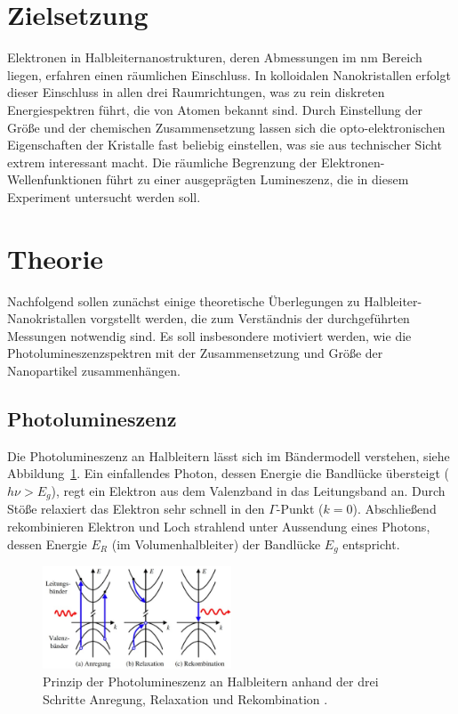 \setcounter{page}{1}
\section*{Zielsetzung}
Elektronen in Halbleiternanostrukturen, deren Abmessungen im $\si{\nano\meter}$ Bereich liegen,
erfahren einen räumlichen Einschluss. In kolloidalen Nanokristallen erfolgt dieser Einschluss
in allen drei Raumrichtungen, was zu rein diskreten Energiespektren führt, die von Atomen bekannt sind.
Durch Einstellung der Größe und der chemischen Zusammensetzung lassen sich die opto-elektronischen
Eigenschaften der Kristalle fast beliebig einstellen, was sie aus technischer Sicht extrem interessant macht.
Die räumliche Begrenzung der Elektronen-Wellenfunktionen führt zu einer ausgeprägten Lumineszenz, die
in diesem Experiment untersucht werden soll.

\section{Theorie}
Nachfolgend sollen zunächst einige theoretische Überlegungen zu Halbleiter-Nanokristallen vorgstellt werden, die
zum Verständnis der durchgeführten Messungen notwendig sind. Es soll insbesondere motiviert werden, wie die
Photolumineszenzspektren mit der Zusammensetzung und Größe der Nanopartikel zusammenhängen.

\subsection{Photolumineszenz}
Die Photolumineszenz an Halbleitern lässt sich im Bändermodell verstehen, siehe Abbildung~\ref{fig: pl}. Ein
einfallendes Photon, dessen Energie die Bandlücke übersteigt ($h\nu > E_g$), regt ein Elektron aus dem
Valenzband in das Leitungsband an.
Durch Stöße relaxiert das Elektron sehr schnell in den $\Gamma$-Punkt ($k = 0$). Abschließend rekombinieren Elektron und Loch
strahlend unter Aussendung eines Photons, dessen Energie $E_R$ (im Volumenhalbleiter) der Bandlücke $E_g$ entspricht.

\begin{figure}
  \centering
  \includegraphics[width = 0.5\textwidth]{pics/PL.png}
  \caption{Prinzip der Photolumineszenz an Halbleitern anhand der drei Schritte Anregung, Relaxation und Rekombination \cite{anleitung_pl}.}
  \label{fig: pl}
\end{figure}


